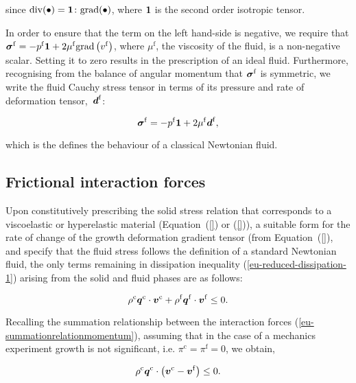 \noindent since \mbox{$\mathrm{div}(\bullet) = {\bf 1} \colon
  \mathrm{grad}(\bullet)$}, where ${\bf 1}$ is the second order
isotropic tensor. 

In order to ensure that the term on the left hand-side is negative, we
require that $\mbox{\boldmath$\sigma$}^{\mathrm{f}} = - p^{\mathrm{f}} {\bf 1} + 2
\mu^{\mathrm{f}} \mathrm{grad}\left( v^{\mathrm{f}} \right)$, where
$\mu^{\mathrm{f}}$, the viscosity of the fluid, is a non-negative
scalar. Setting it to zero results in the prescription of an ideal
fluid. Furthermore, recognising from the balance of angular momentum
that $\mbox{\boldmath$\sigma$}^{\mathrm{f}}$ is symmetric, we write the fluid Cauchy
stress tensor in terms of its pressure and rate of deformation
\mbox{tensor, $\mbox{\boldmath$ d$}^{\mathrm{f}}$}:

\begin{equation}
\mbox{\boldmath$\sigma$}^{\mathrm{f}} = -
p^{\mathrm{f}} {\bf 1} + 2 \mu^{\mathrm{f}}\mbox{\boldmath$ d$}^{\mathrm{f}},
\label{eu-stress-rel-fluid}
\end{equation}

\noindent which is the defines the behaviour of a classical Newtonian
fluid.

\subsection{Frictional interaction forces}
\label{eu-interaction-forces}

Upon constitutively prescribing the solid stress relation that
corresponds to a viscoelastic or hyperelastic material
(Equation~(\ref{}) or (\ref{})), a suitable form for the rate of
change of the growth deformation gradient tensor (from
Equation~(\ref{}), and specify that the fluid stress follows the
definition of a standard Newtonian fluid, the only terms remaining in
dissipation inequality (\ref{eu-reduced-dissipation-1}) arising from
the solid and fluid phases are as follows:

\begin{equation}
\rho^{\mathrm{c}} \mbox{\boldmath$ q$}^{\mathrm{c}}\cdot\mbox{\boldmath$ v$}^{\mathrm{c}} +
\rho^{\mathrm{f}} \mbox{\boldmath$ q$}^{\mathrm{f}}\cdot\mbox{\boldmath$ v$}^{\mathrm{f}} \leq 0.
\end{equation}

Recalling the summation relationship between the interaction forces
(\ref{eu-summationrelationmomentum}), assuming that in the case of a
mechanics experiment growth is not significant, i.e. $\pi^\mathrm{c} =
\pi^\mathrm{f} = 0$, we obtain,

\begin{equation*}
\rho^{\mathrm{c}} \mbox{\boldmath$ q$}^{\mathrm{c}}\cdot \left(\mbox{\boldmath$ v$}^{\mathrm{c}} -
\mbox{\boldmath$ v$}^{\mathrm{f}}\right) \leq 0.
\end{equation*}

